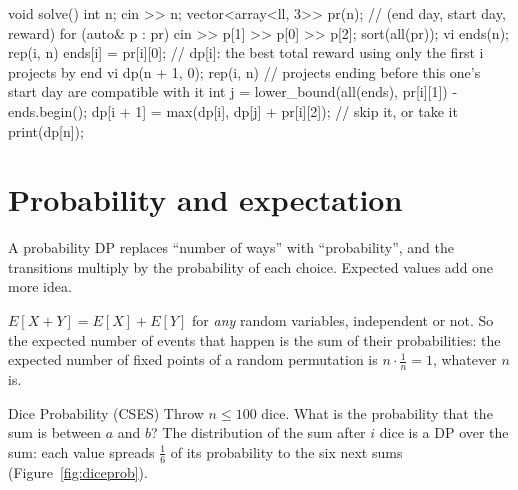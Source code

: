 \begin{code}
void solve() {
    int n;
    cin >> n;
    vector<array<ll, 3>> pr(n);  // (end day, start day, reward)
    for (auto& p : pr) cin >> p[1] >> p[0] >> p[2];
    sort(all(pr));
    vi ends(n);
    rep(i, n) ends[i] = pr[i][0];
    // dp[i]: the best total reward using only the first i projects by end
    vi dp(n + 1, 0);
    rep(i, n) {
        // projects ending before this one's start day are compatible with it
        int j = lower_bound(all(ends), pr[i][1]) - ends.begin();
        dp[i + 1] = max(dp[i], dp[j] + pr[i][2]);  // skip it, or take it
    }
    print(dp[n]);
}
\end{code}

\section[Probability and expectation]{Probability and expectation \hfill \plat}\label{sec:probdp}

A probability DP replaces ``number of ways'' with ``probability'', and the transitions multiply by the probability of each choice.
Expected values add one more idea.

\begin{fact}
$E[X + Y] = E[X] + E[Y]$ for \emph{any} random variables, independent or not. So the expected number of events that happen is the sum
of their probabilities: the expected number of fixed points of a random permutation is $n \cdot \frac1n = 1$, whatever $n$ is.
\end{fact}

\begin{problem}{Dice Probability (CSES)}
Throw $n \le 100$ dice. What is the probability that the sum is between $a$ and $b$?
\solution The distribution of the sum after $i$ dice is a DP over the sum: each value spreads $\frac16$ of its probability to the six
next sums (Figure~\ref{fig:diceprob}).
\end{problem}

